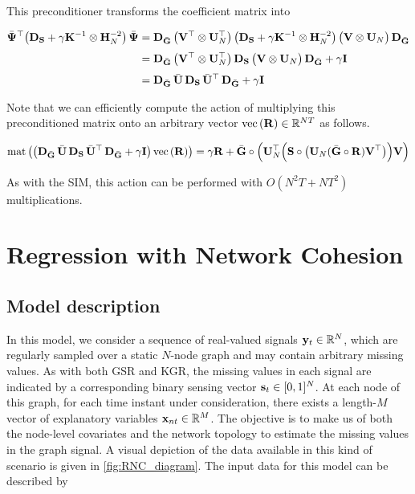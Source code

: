 This preconditioner transforms the coefficient matrix into 

\begin{align*}
    \bar{\mathbf{\Psi}} ^\top \big(\mathbf{D}_{\mathbf{S}} + \gamma \mathbf{K}^{-1} \otimes \mathbf{H}_N^{-2} \big) \, \bar{\mathbf{\Psi}}   &= \mathbf{D}_{\bar{\mathbf{G}}} \, \big(\mathbf{V}^\top \otimes \mathbf{U}_N^\top \big) \, \big(\mathbf{D}_{\mathbf{S}} + \gamma \mathbf{K}^{-1} \otimes \mathbf{H}_N^{-2} \big) \,  \big(\mathbf{V} \otimes \mathbf{U}_N \big) \, \mathbf{D}_{\bar{\mathbf{G}}}   \\[0.1cm]
    &= \mathbf{D}_{\bar{\mathbf{G}}} \, \big(\mathbf{V}^\top \otimes \mathbf{U}_N^\top \big) \, \mathbf{D}_{\mathbf{S}} \, \big(\mathbf{V} \otimes \mathbf{U}_N \big) \, \mathbf{D}_{\bar{\mathbf{G}}} + \gamma \mathbf{I} \\[0.1cm]
    &= \mathbf{D}_{\bar{\mathbf{G}}} \, \bar{\mathbf{U}} \, \mathbf{D}_{\mathbf{S}} \, \bar{\mathbf{U}}^\top \, \mathbf{D}_{\bar{\mathbf{G}}} + \gamma \mathbf{I} 
\end{align*}

Note that we can efficiently compute the action of multiplying this preconditioned matrix onto an arbitrary vector $\text{\textup{vec}}\left(\mathbf{R}\right) \in \mathbb{R}^{NT}$ as follows. 

$$
\text{\textup{mat}}\left(\big(\mathbf{D}_{\bar{\mathbf{G}}} \, \bar{\mathbf{U}} \, \mathbf{D}_{\mathbf{S}} \, \bar{\mathbf{U}}^\top \, \mathbf{D}_{\bar{\mathbf{G}}} + \gamma \mathbf{I}  \big)\, \text{\textup{vec}}\left(\mathbf{R}\right)\right) = \gamma \mathbf{R} + \bar{\mathbf{G}} \circ \left(\mathbf{U}_N^\top \Big( \mathbf{S} \circ \big(\mathbf{U}_N (\bar{\mathbf{G}} \circ \mathbf{R}) \mathbf{V}^\top \big) \Big) \mathbf{V}\right) 
$$

As with the SIM, this action can be performed with $O(N^2T + NT^2)$ multiplications. 



\section{Regression with Network Cohesion}

\label{sec:rnc_mdp}

\subsection{Model description}

In this model, we consider a sequence of real-valued signals $\mathbf{y}_t \in \mathbb{R}^{N}$, which are regularly sampled over a static $N$-node graph and may contain arbitrary missing values. As with both GSR and KGR, the missing values in each signal are indicated by a corresponding binary sensing vector $\mathbf{s}_t \in [0, 1]^{N}$. At each node of this graph, for each time instant under consideration, there exists a length-$M$ vector of explanatory variables $\mathbf{x}_{nt} \in \mathbb{R}^{M}$. The objective is to make us of both the node-level covariates and the network topology to estimate the missing values in the graph signal. A visual depiction of the data available in this kind of scenario is given in \cref{fig:RNC_diagram}. The input data for this model can be described by 

